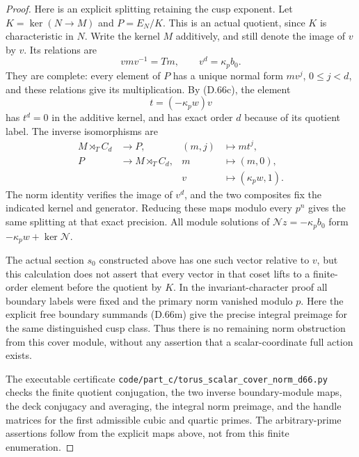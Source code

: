 \begin{proof}
Here is an explicit splitting retaining the cusp exponent.
Let $K=\ker(N\to M)$ and $P=E_N/K$. This is an actual
quotient, since $K$ is characteristic in $N$. Write the
kernel $M$ additively, and still denote the image of $v$
by $v$. Its relations are
\[
           vmv^{-1}=Tm,\qquad v^d=\kappa_p b_0.
                                                               \tag{D.66o}
\]
They are complete: every element of $P$ has a unique
normal form $m v^j$, $0\leq j<d$, and these relations
give its multiplication. By (D.66c), the element
\[
                    t=(-\kappa_p w)v
\]
has $t^d=0$ in the additive kernel, and has exact order
$d$ because of its quotient label. The inverse
isomorphisms are
\[
 \begin{aligned}
 M\rtimes_T C_d&\longrightarrow P,&(m,j)&\longmapsto m t^j,\\
 P&\longrightarrow M\rtimes_T C_d,&m&\longmapsto(m,0),\\
 &&v&\longmapsto(\kappa_p w,1).
 \end{aligned}                                               \tag{D.66p}
\]
The norm identity verifies the image of $v^d$, and
the two composites fix the indicated kernel and generator.
Reducing these maps modulo every $p^n$ gives the same
splitting at that exact precision. All module solutions
of $\mathcal N z=-\kappa_p b_0$ form
$-\kappa_p w+\ker\mathcal N$.

The actual section $s_0$ constructed above has one such
vector relative to $v$, but this calculation does not
assert that every vector in that coset lifts to a
finite-order element before the quotient by $K$.
In the invariant-character proof all boundary labels
were fixed and the primary norm vanished modulo $p$.
Here the explicit free boundary summands (D.66m) give
the precise integral preimage for the same distinguished
cusp class. Thus there is no remaining norm obstruction
from this cover module, without any assertion that a
scalar-coordinate full action exists.

The executable certificate
\texttt{code/part\_c/torus\_scalar\_cover\_norm\_d66.py}
checks the finite quotient conjugation, the two inverse
boundary-module maps, the deck conjugacy and averaging,
the integral norm preimage, and the handle matrices
for the first admissible cubic and quartic primes.
The arbitrary-prime assertions follow from the explicit
maps above, not from this finite enumeration.
\end{proof}
